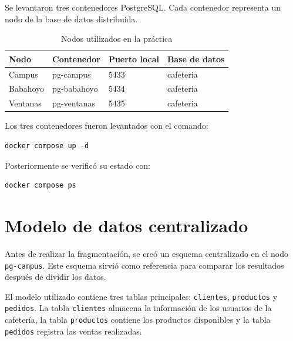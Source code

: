 \documentclass[12pt,a4paper]{article}
\begin{document}
Se levantaron tres contenedores PostgreSQL. Cada contenedor representa un nodo de la base de datos distribuida.

\begin{table}[H]
\centering
\caption{Nodos utilizados en la práctica}
\begin{tabular}{llll}
\toprule
\textbf{Nodo} & \textbf{Contenedor} & \textbf{Puerto local} & \textbf{Base de datos} \\
\midrule
Campus & pg-campus & 5433 & cafeteria \\
Babahoyo & pg-babahoyo & 5434 & cafeteria \\
Ventanas & pg-ventanas & 5435 & cafeteria \\
\bottomrule
\end{tabular}
\end{table}

Los tres contenedores fueron levantados con el comando:

\begin{lstlisting}
docker compose up -d
\end{lstlisting}

Posteriormente se verificó su estado con:

\begin{lstlisting}
docker compose ps
\end{lstlisting}

\section{Modelo de datos centralizado}

Antes de realizar la fragmentación, se creó un esquema centralizado en el nodo \texttt{pg-campus}. Este esquema sirvió como referencia para comparar los resultados después de dividir los datos.

El modelo utilizado contiene tres tablas principales: \texttt{clientes}, \texttt{productos} y \texttt{pedidos}. La tabla \texttt{clientes} almacena la información de los usuarios de la cafetería, la tabla \texttt{productos} contiene los productos disponibles y la tabla \texttt{pedidos} registra las ventas realizadas.
\end{document}
